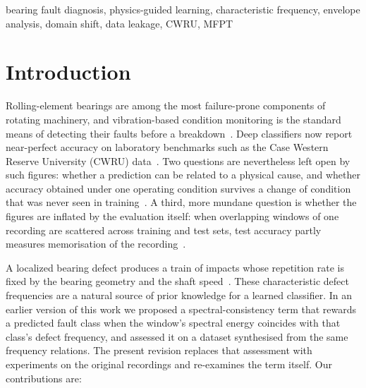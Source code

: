 \documentclass[conference]{IEEEtran}
\begin{document}
\begin{IEEEkeywords}
bearing fault diagnosis, physics-guided learning, characteristic frequency,
envelope analysis, domain shift, data leakage, CWRU, MFPT
\end{IEEEkeywords}

\section{Introduction}
Rolling-element bearings are among the most failure-prone components of
rotating machinery, and vibration-based condition monitoring is the standard
means of detecting their faults before a breakdown~\cite{jardine2006}. Deep
classifiers now report near-perfect accuracy on laboratory benchmarks such as
the Case Western Reserve University (CWRU) data~\cite{zhang2017,wen2018,hoang2019}.
Two questions are nevertheless left open by such figures: whether a
prediction can be related to a physical cause, and whether accuracy obtained
under one operating condition survives a change of condition that was never
seen in training~\cite{lei2020}. A third, more mundane question is whether the
figures are inflated by the evaluation itself: when overlapping windows of one
recording are scattered across training and test sets, test accuracy partly
measures memorisation of the recording~\cite{smith2015,zhao2020}.

A localized bearing defect produces a train of impacts whose repetition rate is
fixed by the bearing geometry and the shaft speed~\cite{mcfadden1984,randall2011}.
These characteristic defect frequencies are a natural source of prior knowledge
for a learned classifier. In an earlier version of this work we proposed a
spectral-consistency term that rewards a predicted fault class when the
window's spectral energy coincides with that class's defect frequency, and
assessed it on a dataset synthesised from the same frequency relations. The
present revision replaces that assessment with experiments on the original
recordings and re-examines the term itself. Our contributions are:
\end{document}
